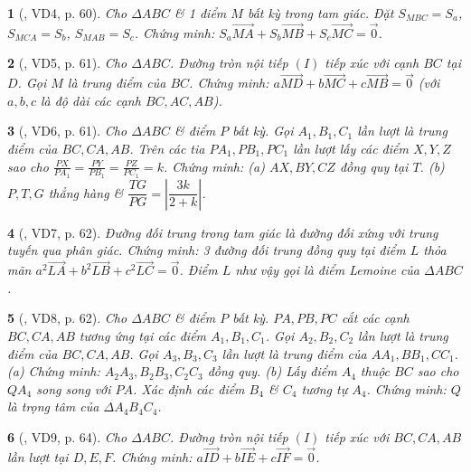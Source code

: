 \documentclass{article}
\newtheorem{baitoan}{}
\begin{document}
\begin{baitoan}[\cite{Hai_Hung_Thu_Tung2022_tap_1}, VD4, p. 60]
	Cho $\Delta ABC$ \& 1 điểm $M$ bất kỳ trong tam giác. Đặt $S_{MBC} = S_a$, $S_{MCA} = S_b$, $S_{MAB} = S_c$. Chứng minh: $S_a\overrightarrow{MA} + S_b\overrightarrow{MB} + S_c\overrightarrow{MC} = \vec{0}$.
\end{baitoan}

\begin{baitoan}[\cite{Hai_Hung_Thu_Tung2022_tap_1}, VD5, p. 61]
	Cho $\Delta ABC$. Đường tròn nội tiếp $(I)$ tiếp xúc với cạnh $BC$ tại $D$. Gọi $M$ là trung điểm của $BC$. Chứng minh: $a\overrightarrow{MD} + b\overrightarrow{MC} + c\overrightarrow{MB} = \vec{0}$ (với $a,b,c$ là độ dài các cạnh $BC,AC,AB$).
\end{baitoan}

\begin{baitoan}[\cite{Hai_Hung_Thu_Tung2022_tap_1}, VD6, p. 61]
	Cho $\Delta ABC$ \& điểm $P$ bất kỳ. Gọi $A_1,B_1,C_1$ lần lượt là trung điểm của $BC,CA,AB$. Trên các tia $PA_1,PB_1,PC_1$ lần lượt lấy các điểm $X,Y,Z$ sao cho $\frac{PX}{PA_1} = \frac{PY}{PB_1} = \frac{PZ}{PC_1} = k$. Chứng minh: (a) $AX,BY,CZ$ đồng quy tại $T$. (b) $P,T,G$ thẳng hàng \& $\dfrac{TG}{PG} = \left|\dfrac{3k}{2 + k}\right|$.
\end{baitoan}

\begin{baitoan}[\cite{Hai_Hung_Thu_Tung2022_tap_1}, VD7, p. 62]
	Đường đối trung trong tam giác là đường đối xứng với trung tuyến qua phân giác. Chứng minh: 3 đường đối trung đồng quy tại điểm $L$ thỏa mãn $a^2\overrightarrow{LA} + b^2\overrightarrow{LB} + c^2\overrightarrow{LC} = \vec{0}$. Điểm $L$ như vậy gọi là \emph{điểm Lemoine} của $\Delta ABC$.
\end{baitoan}

\begin{baitoan}[\cite{Hai_Hung_Thu_Tung2022_tap_1}, VD8, p. 62]
	Cho $\Delta ABC$ \& điểm $P$ bất kỳ. $PA,PB,PC$ cắt các cạnh $BC,CA,AB$ tương ứng tại các điểm $A_1,B_1,C_1$. Gọi $A_2,B_2,C_2$ lần lượt là trung điểm của $BC,CA,AB$. Gọi $A_3,B_3,C_3$ lần lượt là trung điểm của $AA_1,BB_1,CC_1$. (a) Chứng minh: $A_2A_3,B_2B_3,C_2C_3$ đồng quy. (b) Lấy điểm $A_4$ thuộc $BC$ sao cho $QA_4$ song song với $PA$. Xác định các điểm $B_4$ \& $C_4$ tương tự $A_4$. Chứng minh: $Q$ là trọng tâm của $\Delta A_4B_4C_4$.
\end{baitoan}

\begin{baitoan}[\cite{Hai_Hung_Thu_Tung2022_tap_1}, VD9, p. 64]
	Cho $\Delta ABC$. Đường tròn nội tiếp $(I)$ tiếp xúc với $BC,CA,AB$ lần lượt tại $D,E,F$. Chứng minh: $a\overrightarrow{ID} + b\overrightarrow{IE} + c\overrightarrow{IF} = \vec{0}$.
\end{baitoan}
\end{document}
